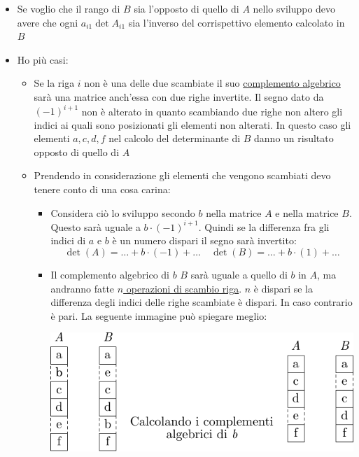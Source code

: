 \begin{itemize}
	\item Se voglio che il rango di $ B $ sia l'opposto di quello di $ A $ nello sviluppo devo avere che ogni $ a_{i 1} \det A_{i 1} $ sia l'inverso del corrispettivo elemento calcolato in $ B $
	\item Ho più casi:
	      \begin{itemize}
		      \item Se la riga $ i $ non è una delle due scambiate il suo \underline{complemento algebrico} sarà una matrice anch'essa con due righe invertite. Il segno dato da $ \left( -1 \right) ^{i+1} $ non è alterato in quanto scambiando due righe non altero gli indici ai quali sono posizionati gli elementi non alterati.
		            \vskip3mm
		            In questo caso gli elementi  $a,c,d,f$ nel calcolo del determinante di $ B $ danno un risultato opposto di quello di $ A $
		      \item Prendendo in considerazione gli elementi che vengono scambiati devo tenere conto di una cosa carina:
		            \begin{itemize}
			            \item Considera ciò lo sviluppo secondo $ b $ nella matrice $ A $ e nella matrice $ B $. Questo sarà uguale a $ b \cdot \left( -1 \right) ^{i+1} $. Quindi se la differenza fra gli indici di $ a $ e $ b $ è un numero dispari il segno sarà invertito:
			                  \[
				                  \det \left( A \right)  = \ldots + b \cdot\left( -1 \right)+\ldots \quad \det \left( B \right)  = \ldots + b \cdot \left( 1 \right) +\ldots
			                  \]
			            \item Il complemento algebrico di $b$ $ B $ sarà uguale a quello di $ b $ in $ A $, ma andranno fatte \underline{$ n $ operazioni di scambio riga}. $ n $ è dispari se la differenza degli indici delle righe scambiate è dispari. In caso contrario è pari. La seguente immagine può spiegare meglio:
			                  \begin{center}
				                  \includegraphics{Images/DimDeterminante1.pdf}

\end{center}
\end{itemize}
\end{itemize}
\end{itemize}
